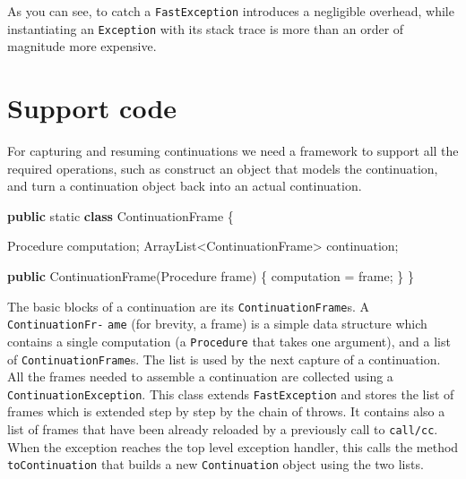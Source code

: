 \documentclass[12pt,a4paper,oneside,openright]{book}
\newenvironment{Shaded}{\begin{snugshade}}{\end{snugshade}}
\newcommand{\KeywordTok}[1]{\textcolor[rgb]{0.13,0.29,0.53}{\textbf{{#1}}}}
\newcommand{\DataTypeTok}[1]{\textcolor[rgb]{0.13,0.29,0.53}{{#1}}}
\newcommand{\FunctionTok}[1]{\textcolor[rgb]{0.00,0.00,0.00}{{#1}}}
\newcommand{\NormalTok}[1]{{#1}}
\begin{document}
As you can see, to catch a \texttt{FastException} introduces a
negligible overhead, while instantiating an \texttt{Exception} with its
stack trace is more than an order of magnitude more expensive.

\section{Support code}\label{support-code}

For capturing and resuming continuations we need a framework to support
all the required operations, such as construct an object that models the
continuation, and turn a continuation object back into an actual
continuation.

\begin{Shaded}
\begin{Highlighting}[]
    \KeywordTok{public} \DataTypeTok{static} \KeywordTok{class} \NormalTok{ContinuationFrame \{}

        \NormalTok{Procedure computation;}
        \NormalTok{ArrayList<ContinuationFrame> continuation;}

        \KeywordTok{public} \FunctionTok{ContinuationFrame}\NormalTok{(Procedure frame) \{}
            \NormalTok{computation = frame;}
        \NormalTok{\}}
    \NormalTok{\}}
\end{Highlighting}
\end{Shaded}

The basic blocks of a continuation are its \texttt{ContinuationFrame}s.
A \texttt{ContinuationFr-} \texttt{ame} (for brevity, a frame) is a
simple data structure which contains a single computation (a
\texttt{Procedure} that takes one argument), and a list of
\texttt{ContinuationFrame}s. The list is used by the next capture of a
continuation. All the frames needed to assemble a continuation are
collected using a \texttt{ContinuationException}. This class extends
\texttt{FastException} and stores the list of frames which is extended
step by step by the chain of throws. It contains also a list of frames
that have been already reloaded by a previously call to
\texttt{call/cc}. When the exception reaches the top level exception
handler, this calls the method \texttt{toContinuation} that builds a new
\texttt{Continuation} object using the two lists.
\end{document}

